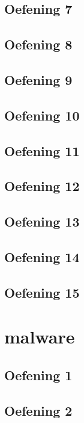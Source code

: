 \documentclass[a4paper,11pt]{report}
\begin{document}
\section{Oefening 7}

\section{Oefening 8}

\section{Oefening 9}

\section{Oefening 10}

\section{Oefening 11}

\section{Oefening 12}

\section{Oefening 13}

\section{Oefening 14}

\section{Oefening 15}

\newpage

\chapter{malware}
\section{Oefening 1}

\section{Oefening 2}

\end{document}
